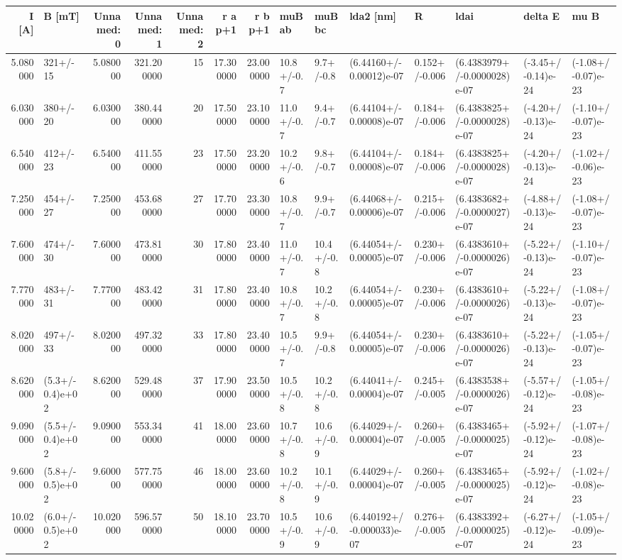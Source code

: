 \begin{tabular}{rlrrrrrlllllll}
\toprule
I [A] & B [mT] & Unnamed: 0 & Unnamed: 1 & Unnamed: 2 & r a p+1 & r b p+1 & muBab & muBbc & lda2 [nm] & R & ldai & delta E & mu B \\
\midrule
5.080000 & 321+/-15 & 5.080000 & 321.200000 & 15 & 17.300000 & 23.000000 & 10.8+/-0.7 & 9.7+/-0.8 & (6.44160+/-0.00012)e-07 & 0.152+/-0.006 & (6.4383979+/-0.0000028)e-07 & (-3.45+/-0.14)e-24 & (-1.08+/-0.07)e-23 \\
6.030000 & 380+/-20 & 6.030000 & 380.440000 & 20 & 17.500000 & 23.100000 & 11.0+/-0.7 & 9.4+/-0.7 & (6.44104+/-0.00008)e-07 & 0.184+/-0.006 & (6.4383825+/-0.0000028)e-07 & (-4.20+/-0.13)e-24 & (-1.10+/-0.07)e-23 \\
6.540000 & 412+/-23 & 6.540000 & 411.550000 & 23 & 17.500000 & 23.200000 & 10.2+/-0.6 & 9.8+/-0.7 & (6.44104+/-0.00008)e-07 & 0.184+/-0.006 & (6.4383825+/-0.0000028)e-07 & (-4.20+/-0.13)e-24 & (-1.02+/-0.06)e-23 \\
7.250000 & 454+/-27 & 7.250000 & 453.680000 & 27 & 17.700000 & 23.300000 & 10.8+/-0.7 & 9.9+/-0.7 & (6.44068+/-0.00006)e-07 & 0.215+/-0.006 & (6.4383682+/-0.0000027)e-07 & (-4.88+/-0.13)e-24 & (-1.08+/-0.07)e-23 \\
7.600000 & 474+/-30 & 7.600000 & 473.810000 & 30 & 17.800000 & 23.400000 & 11.0+/-0.7 & 10.4+/-0.8 & (6.44054+/-0.00005)e-07 & 0.230+/-0.006 & (6.4383610+/-0.0000026)e-07 & (-5.22+/-0.13)e-24 & (-1.10+/-0.07)e-23 \\
7.770000 & 483+/-31 & 7.770000 & 483.420000 & 31 & 17.800000 & 23.400000 & 10.8+/-0.7 & 10.2+/-0.8 & (6.44054+/-0.00005)e-07 & 0.230+/-0.006 & (6.4383610+/-0.0000026)e-07 & (-5.22+/-0.13)e-24 & (-1.08+/-0.07)e-23 \\
8.020000 & 497+/-33 & 8.020000 & 497.320000 & 33 & 17.800000 & 23.400000 & 10.5+/-0.7 & 9.9+/-0.8 & (6.44054+/-0.00005)e-07 & 0.230+/-0.006 & (6.4383610+/-0.0000026)e-07 & (-5.22+/-0.13)e-24 & (-1.05+/-0.07)e-23 \\
8.620000 & (5.3+/-0.4)e+02 & 8.620000 & 529.480000 & 37 & 17.900000 & 23.500000 & 10.5+/-0.8 & 10.2+/-0.8 & (6.44041+/-0.00004)e-07 & 0.245+/-0.005 & (6.4383538+/-0.0000026)e-07 & (-5.57+/-0.12)e-24 & (-1.05+/-0.08)e-23 \\
9.090000 & (5.5+/-0.4)e+02 & 9.090000 & 553.340000 & 41 & 18.000000 & 23.600000 & 10.7+/-0.8 & 10.6+/-0.9 & (6.44029+/-0.00004)e-07 & 0.260+/-0.005 & (6.4383465+/-0.0000025)e-07 & (-5.92+/-0.12)e-24 & (-1.07+/-0.08)e-23 \\
9.600000 & (5.8+/-0.5)e+02 & 9.600000 & 577.750000 & 46 & 18.000000 & 23.600000 & 10.2+/-0.8 & 10.1+/-0.9 & (6.44029+/-0.00004)e-07 & 0.260+/-0.005 & (6.4383465+/-0.0000025)e-07 & (-5.92+/-0.12)e-24 & (-1.02+/-0.08)e-23 \\
10.020000 & (6.0+/-0.5)e+02 & 10.020000 & 596.570000 & 50 & 18.100000 & 23.700000 & 10.5+/-0.9 & 10.6+/-0.9 & (6.440192+/-0.000033)e-07 & 0.276+/-0.005 & (6.4383392+/-0.0000025)e-07 & (-6.27+/-0.12)e-24 & (-1.05+/-0.09)e-23 \\
\bottomrule
\end{tabular}
